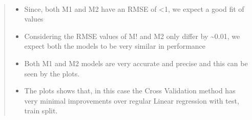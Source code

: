 \documentclass[11pt,a3paper]{article}
\makeatletter
\providecommand{\tightlist}{%
      \setlength{\itemsep}{0pt}\setlength{\parskip}{0pt}}
\newcommand{\boxspacing}{\kern\kvtcb@left@rule\kern\kvtcb@boxsep}
\newcommand{\prompt}[4]{
        {\ttfamily\llap{{\color{#2}[#3]:\hspace{3pt}#4}}\vspace{-\baselineskip}}
    }
\makeatother
\begin{document}
    \begin{center}
    \end{center}
    { \hspace*{\fill} \\}
    
    \begin{quote}
\begin{itemize}
\tightlist
\item
  Since, both M1 and M2 have an RMSE of \textless1, we expect a good fit
  of values
\item
  Considering the RMSE values of M! and M2 only differ by
  \textasciitilde0.01, we expect both the models to be very similar in
  performance
\item
  Both M1 and M2 models are very accurate and precise and this can be
  seen by the plots.
\item
  The plots shows that, in this case the Cross Validation method has
  very minimal improvements over regular Linear regression with test,
  train split.
\end{itemize}
\end{quote}

    \begin{tcolorbox}[breakable, size=fbox, boxrule=1pt, pad at break*=1mm,colback=cellbackground, colframe=cellborder]
\prompt{In}{incolor}{ }{\boxspacing}
\begin{Verbatim}[commandchars=\\\{\}]

\end{Verbatim}
\end{tcolorbox}


    
    
    
\end{document}
